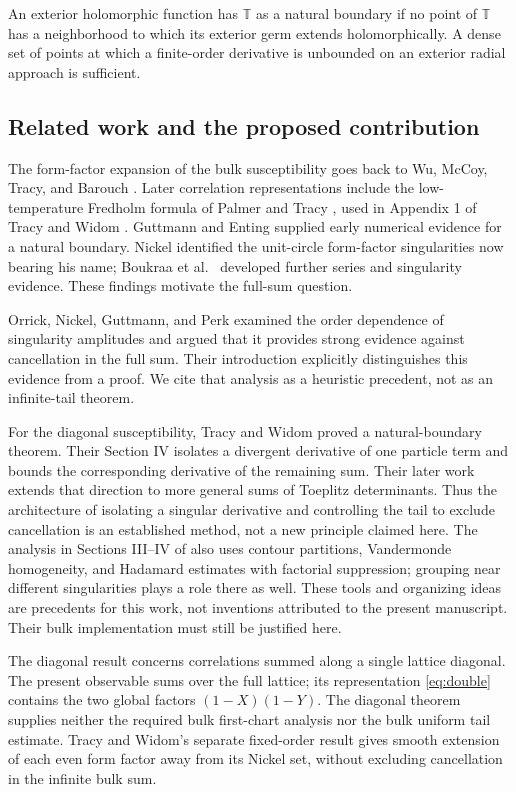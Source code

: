 \documentclass[11pt]{article}
\numberwithin{equation}{section}
\theoremstyle{definition}
\newcommand{\T}{\mathbb T}
\begin{document}
An exterior holomorphic function has \(\T\) as a natural boundary if no
point of \(\T\) has a neighborhood to which its exterior germ extends
holomorphically. A dense set of points at which a finite-order derivative
is unbounded on an exterior radial approach is sufficient.

\subsection{Related work and the proposed contribution}
The form-factor expansion of the bulk susceptibility goes back to
Wu, McCoy, Tracy, and Barouch \cite{WMTB1976}. Later correlation
representations include the low-temperature Fredholm formula of
Palmer and Tracy \cite{PalmerTracy1981}, used in Appendix 1 of
Tracy and Widom \cite{TW2014}. Guttmann and Enting
\cite{GuttmannEnting1996} supplied early numerical evidence for a
natural boundary. Nickel \cite{Nickel1999,Nickel2000} identified
the unit-circle form-factor singularities now bearing his name;
Boukraa et al.\ \cite{Boukraa2008} developed further series and
singularity evidence. These findings motivate the full-sum question.

Orrick, Nickel, Guttmann, and Perk \cite[Section~3.2]{Orrick2001}
examined the order dependence of singularity amplitudes and argued
that it provides strong evidence against cancellation in the full sum.
Their introduction explicitly distinguishes this evidence from a proof.
We cite that analysis as a heuristic precedent, not as an infinite-tail
theorem.

For the diagonal susceptibility, Tracy and Widom \cite{TW2013}
proved a natural-boundary theorem. Their Section IV isolates a
divergent derivative of one particle term and bounds the corresponding
derivative of the remaining sum. Their later work
\cite{TW2017Toeplitz} extends that direction to more general sums
of Toeplitz determinants. Thus the architecture of isolating a
singular derivative and controlling the tail to exclude cancellation
is an established method, not a new principle claimed here.
The analysis in Sections III--IV of \cite{TW2017Toeplitz} also uses
contour partitions, Vandermonde homogeneity, and Hadamard estimates
with factorial suppression; grouping near different singularities
plays a role there as well. These tools and organizing ideas are
precedents for this work, not inventions attributed to the present
manuscript. Their bulk implementation must still be justified here.

The diagonal result concerns correlations summed along a single
lattice diagonal. The present observable sums over the full lattice;
its representation \eqref{eq:double} contains the two global factors
\((1-X)(1-Y)\). The diagonal theorem supplies neither the required
bulk first-chart analysis nor the bulk uniform tail estimate.
Tracy and Widom's separate fixed-order result \cite{TW2014}
gives smooth extension of each even form factor away from its Nickel
set, without excluding cancellation in the infinite bulk sum.
\end{document}
